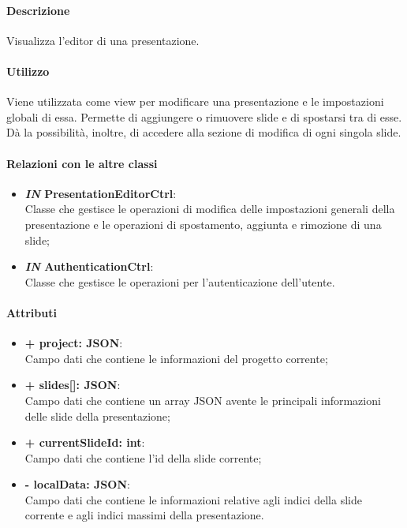 	\paragraph{Descrizione}
	Visualizza l'editor di una presentazione.
	
	\paragraph{Utilizzo}
	Viene utilizzata come view per modificare una presentazione e le impostazioni globali di essa. Permette di aggiungere o rimuovere \gls{slide} e di spostarsi tra di esse. Dà la possibilità, inoltre, di accedere alla sezione di modifica di ogni singola \gls{slide}.
	
	\paragraph{Relazioni con le altre classi}
	\begin{itemize}
		\item \textbf{\textit{IN} PresentationEditorCtrl}:\\
		Classe che gestisce le operazioni di modifica delle impostazioni generali della presentazione e le operazioni di spostamento, aggiunta e rimozione di una \gls{slide};
		\item \textbf{\textit{IN} AuthenticationCtrl}:\\
		Classe che gestisce le operazioni per l'autenticazione dell'utente.
	\end{itemize}
	
	\paragraph{Attributi}
	\begin{itemize}
		\item \textbf{+ project: \gls{JSON}}:\\
		Campo dati che contiene le informazioni del progetto corrente;
		\item \textbf{+ slides[]: \gls{JSON}}:\\
		Campo dati che contiene un array \gls{JSON} avente le principali informazioni delle \gls{slide} della presentazione;
		\item \textbf{+ currentSlideId: int}:\\
		Campo dati che contiene l'id della \gls{slide} corrente;
		\item \textbf{- localData: \gls{JSON}}:\\
		Campo dati che contiene le informazioni relative agli indici della \gls{slide} corrente e agli indici massimi della presentazione.
	\end{itemize}
\newpage
	
